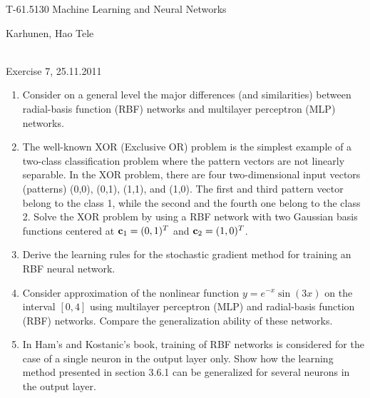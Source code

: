 \documentclass[10pt]{article}
\begin{document}
\pagestyle{empty}
\begin{Large}
\begin{bf} 
T-61.5130 Machine Learning and Neural Networks\\ 
\end{bf}
\end{Large}
Karhunen, Hao Tele\\  
\\
\begin{large}
\begin{bf}
Exercise 7,  25.11.2011
\end{bf}
\end{large}
\begin{enumerate}

\item Consider on a general level the major differences (and similarities)
  between radial-basis function (RBF) networks and multilayer perceptron
  (MLP) networks.

\vspace{2mm}

\item The well-known XOR (Exclusive OR) problem is the simplest example of a
  two-class classification problem where the pattern vectors are not linearly
  separable. In the XOR problem, there are four two-dimensional input vectors
  (patterns) (0,0), (0,1), (1,1), and (1,0). The first and third pattern
  vector belong to the class 1, while the second and the fourth one belong
  to the class 2. Solve the XOR problem by using a RBF network with two
  Gaussian basis functions centered at ${\bf c}_1 = (0,1)^T$ and
  ${\bf c}_2 = (1,0)^T$.

\vspace{2mm}

\item Derive the learning rules for the stochastic gradient method for
  training an RBF neural network.

\vspace{2mm}

\item Consider approximation of the nonlinear function $y = e^{-x} \sin(3x)$
  on the interval $[0,4]$ using multilayer perceptron (MLP) and radial-basis
  function (RBF) networks. Compare the generalization ability of these
  networks.

\vspace{2mm}

\item In Ham's and Kostanic's book, training of RBF networks is considered for the
  case of a single neuron in the output layer only. Show how the learning method
  presented in section 3.6.1 can be generalized for several neurons in the
  output layer.


\end{enumerate}
\end{document}
